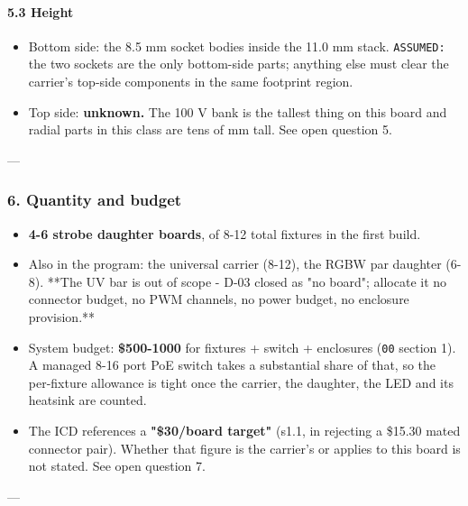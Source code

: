 \documentclass[11pt,a4paper]{article}
\begin{document}
\paragraph*{5.3 Height}
\begin{itemize}
\item Bottom side: the 8.5 mm socket bodies inside the 11.0 mm stack. \texttt{ASSUMED:} the two sockets
are the only bottom-side parts; anything else must clear the carrier's top-side components
in the same footprint region.
\item Top side: \textbf{unknown.} The 100 V bank is the tallest thing on this board and radial parts in
this class are tens of mm tall. See open question 5.
\end{itemize}
---

\subsubsection*{6. Quantity and budget}
\begin{itemize}
\item \textbf{4-6 strobe daughter boards}, of 8-12 total fixtures in the first build.
\item Also in the program: the universal carrier (8-12), the RGBW par daughter (6-8). {*}{*}The UV bar
is out of scope - D-03 closed as "no board"; allocate it no connector budget, no PWM
channels, no power budget, no enclosure provision.{*}{*}
\item System budget: \textbf{\$500-1000} for fixtures + switch + enclosures (\texttt{00} section 1). A managed
8-16 port PoE switch takes a substantial share of that, so the per-fixture allowance is
tight once the carrier, the daughter, the LED and its heatsink are counted.
\item The ICD references a \textbf{"\$30/board target"} (s1.1, in rejecting a \$15.30 mated connector
pair). Whether that figure is the carrier's or applies to this board is not stated. See
open question 7.
\end{itemize}
---
\end{document}
